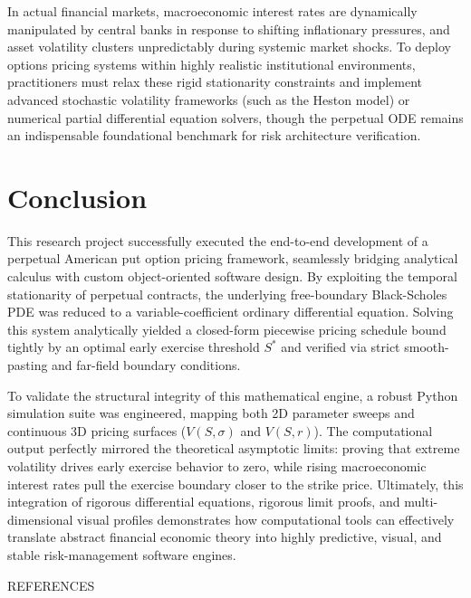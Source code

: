 \documentclass[12pt]{article}
\theoremstyle{definition}
\numberwithin{equation}{section}
\begin{document}
In actual financial markets, 
macroeconomic interest rates are dynamically manipulated by central banks in response to shifting inflationary pressures, 
and asset volatility clusters unpredictably during systemic market shocks. 
To deploy options pricing systems within highly realistic institutional environments, 
practitioners must relax these rigid stationarity constraints and implement advanced stochastic volatility frameworks (such as the Heston model) or numerical partial differential equation solvers, 
though the perpetual ODE remains an indispensable foundational benchmark for risk architecture verification.

\section{Conclusion}
This research project successfully executed the end-to-end development of a perpetual American put option pricing framework, 
seamlessly bridging analytical calculus with custom object-oriented software design. 
By exploiting the temporal stationarity of perpetual contracts, 
the underlying free-boundary Black-Scholes PDE was reduced to a variable-coefficient ordinary differential equation. 
Solving this system analytically yielded a closed-form piecewise pricing schedule bound tightly by an optimal early exercise threshold $S^*$ and verified via strict smooth-pasting and far-field boundary conditions.

To validate the structural integrity of this mathematical engine, 
a robust Python simulation suite was engineered, mapping both 2D parameter sweeps and continuous 3D pricing surfaces ($V(S, \sigma)$ and $V(S, r)$). 
The computational output perfectly mirrored the theoretical asymptotic limits: proving that extreme volatility drives early exercise behavior to zero, 
while rising macroeconomic interest rates pull the exercise boundary closer to the strike price. 
Ultimately, this integration of rigorous differential equations, 
rigorous limit proofs, and multi-dimensional visual profiles demonstrates how computational tools 
can effectively translate abstract financial economic theory into highly predictive, visual, and stable risk-management software engines.

\vfill\pagebreak


REFERENCES


   
 
\end{document}
